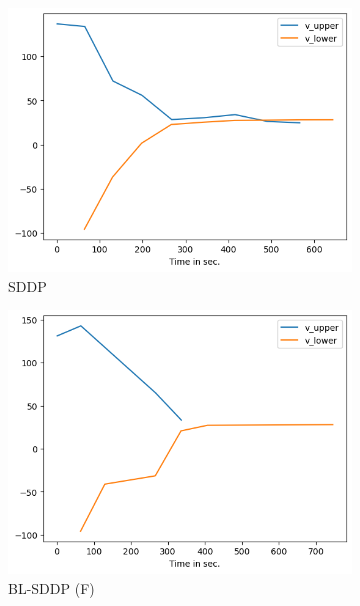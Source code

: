 \documentclass[a4paper,12pt]{article}
\begin{document}
\begin{figure}[h]
    \centering %
\begin{subfigure}{0.32\textwidth}
  \includegraphics[width=\linewidth]{sddp_6.png}
  \caption{SDDP}
  \label{fig:1}
\end{subfigure}\hfil %
\begin{subfigure}{0.32\textwidth}
  \includegraphics[width=\linewidth]{blsddp_6_full.png}
  \caption{BL-SDDP (F)}
  \label{fig:2}
\end{subfigure}\hfil %
\begin{subfigure}{0.32\textwidth}

\end{subfigure}
\end{figure}
\end{document}

